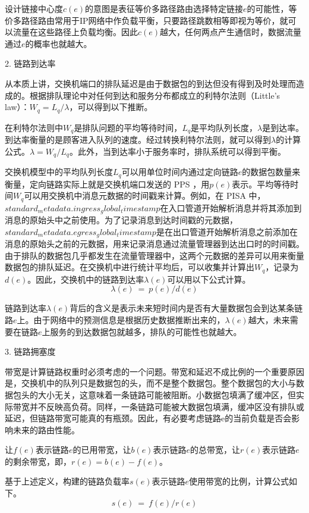 设计链接中心度$c(e)$的意图是表征等价多路径路由选择特定链接$e$的可能性，等价多路径路由常用于IP网络中作负载平衡，只要路径跳数相等即视为等价，就可以流量在这些路径上负载均衡。因此$c(e)$越大，任何两点产生通信时，数据流量通过$e$的概率也就越大。

2. 链路到达率

从本质上讲，交换机端口的排队延迟是由于数据包的到达但没有得到及时处理而造成的。根据排队理论中对任何到达和服务分布都成立的利特尔法则（Little's law）：$W_q=L_q/\lambda$，可以得到以下推断。

在利特尔法则中$W_q$是排队问题的平均等待时间，$L_q$是平均队列长度，$\lambda$是到达率。到达率衡量的是顾客进入队列的速度。经过转换利特尔法则，就可以得到$\lambda$的计算公式。$\lambda=W_q/L_q$。此外，当到达率小于服务率时，排队系统可以得到平衡。

交换机模型中的平均队列长度$L_q$可以用单位时间内通过定向链路$e$的数据包数量来衡量，定向链路实际上就是交换机端口发送的 \gls*{PPS} ，用$p(e)$表示。平均等待时间$W_q$可以用交换机中消息元数据的时间戳来计算。例如，在 \gls*{PISA} 中，$standard_metadata.ingress_global_timestamp$在入口管道开始解析消息并将其添加到消息的原始头中之前使用。为了记录消息到达时间戳的元数据，$standard_metadata.egress_global_timestamp$是在出口管道开始解析消息之前添加在消息的原始头之前的元数据，用来记录消息通过流量管理器到达出口时的时间戳。由于排队的数据包几乎都发生在流量管理器中，这两个元数据的差异可以用来衡量数据包的排队延迟。在交换机中进行统计平均后，可以收集并计算出$W_q$，记录为$d(e)$。因此，交换机中的链路到达率$\lambda(e)$可以用以下公式计算。
$$\lambda(e)\ =\ p(e)/d(e)$$

链路到达率$\lambda(e)$背后的含义是表示未来短时间内是否有大量数据包会到达某条链路$e$上。由于网络中的预测信息是根据历史数据推断出来的，$\lambda(e)$越大，未来需要在链路$e$上服务的到达数据包就越多，排队的可能性也就越大。

3. 链路拥塞度

带宽是计算链路权重时必须考虑的一个问题。带宽和延迟不成比例的一个重要原因是，交换机中的队列只是数据包的头，而不是整个数据包。整个数据包的大小与数据包头的大小无关，这意味着一条链路可能被阻断。小数据包填满了缓冲区，但实际带宽并不反映高负荷。同样，一条链路可能被大数据包填满，缓冲区没有排队或延迟，但链路带宽可能真的有瓶颈。因此，有必要考虑链路e的当前负载是否会影响未来的路由性能。

让$f(e)$表示链路$e$的已用带宽，让$b(e)$表示链路$e$的总带宽，让$r(e)$表示链路$e$的剩余带宽，即，$r(e)=b(e)-f(e)$。

基于上述定义，构建的链路负载率$s(e)$表示链路$e$使用带宽的比例，计算公式如下。
$$s(e)\ =\ f(e)/r(e)$$

